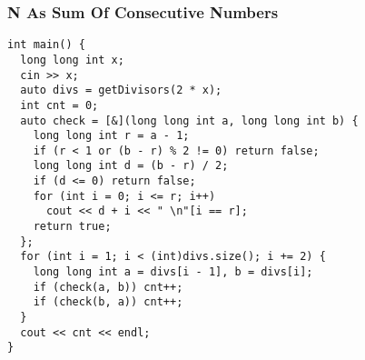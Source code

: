 \documentclass[twoside]{article}
\begin{document}
\begin{multicols*}{2}
\subsubsection*{N As Sum Of Consecutive Numbers}
\begin{verbatim}
int main() {
  long long int x;
  cin >> x;
  auto divs = getDivisors(2 * x);
  int cnt = 0;
  auto check = [&](long long int a, long long int b) {
    long long int r = a - 1;
    if (r < 1 or (b - r) % 2 != 0) return false;
    long long int d = (b - r) / 2;
    if (d <= 0) return false;
    for (int i = 0; i <= r; i++)
      cout << d + i << " \n"[i == r];
    return true;
  };
  for (int i = 1; i < (int)divs.size(); i += 2) {
    long long int a = divs[i - 1], b = divs[i];
    if (check(a, b)) cnt++;
    if (check(b, a)) cnt++;
  }
  cout << cnt << endl;
}
\end{verbatim}

\end{multicols*}
\end{document}
